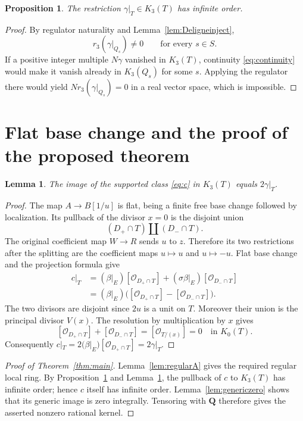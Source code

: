 \documentclass[11pt,a4paper]{article}
\newtheorem{proposition}[theorem]{Proposition}
\newtheorem{lemma}[theorem]{Lemma}
\theoremstyle{remark}
\newcommand{\Q}{\mathbf Q}
\newcommand{\OO}{\mathcal O}
\begin{document}
\begin{proposition}\label{prop:infinite}
The restriction $\gamma|_T\in K_3(T)$ has infinite order.
\end{proposition}
\begin{proof}
By regulator naturality and Lemma~\ref{lem:Deligneinject},
\[
r_3(\gamma|_{Q_s})\neq 0
\qquad\text{for every }s\in S.
\]
If a positive integer multiple $N\gamma$ vanished in $K_3(T)$, continuity \eqref{eq:continuity} would make it vanish already in $K_3(Q_s)$ for some $s$. Applying the regulator there would yield $N r_3(\gamma|_{Q_s})=0$ in a real vector space, which is impossible.
\end{proof}

\section{Flat base change and the proof of the proposed theorem}

\begin{lemma}\label{lem:basechange}
The image of the supported class \eqref{eq:c} in $K_3(T)$ equals $2\gamma|_T$.
\end{lemma}
\begin{proof}
The map $A\to B[1/u]$ is flat, being a finite free base change followed by localization. Its pullback of the divisor $x=0$ is the disjoint union
\[
(D_+\cap T)\amalg(D_-\cap T).
\]
The original coefficient map $W\to R$ sends $u$ to $z$. Therefore its two restrictions after the splitting are the coefficient maps $u\mapsto u$ and $u\mapsto -u$. Flat base change and the projection formula give
\begin{align*}
c|_T
&=(\beta|_E)[\OO_{D_+\cap T}]+(\sigma\beta|_E)[\OO_{D_-\cap T}]\\
&=(\beta|_E)\bigl([\OO_{D_+\cap T}]-[\OO_{D_-\cap T}]\bigr).
\end{align*}
The two divisors are disjoint since $2u$ is a unit on $T$. Moreover their union is the principal divisor $V(x)$. The resolution by multiplication by $x$ gives
\[
[\OO_{D_+\cap T}]+[\OO_{D_-\cap T}]
=[\OO_{T/(x)}]=0\quad\text{in }K_0(T).
\]
Consequently $c|_T=2(\beta|_E)[\OO_{D_+\cap T}]=2\gamma|_T$.
\end{proof}

\begin{proof}[Proof of Theorem~\ref{thm:main}]
Lemma~\ref{lem:regularA} gives the required regular local ring. By Proposition~\ref{prop:infinite} and Lemma~\ref{lem:basechange}, the pullback of $c$ to $K_3(T)$ has infinite order; hence $c$ itself has infinite order. Lemma~\ref{lem:genericzero} shows that its generic image is zero integrally. Tensoring with $\Q$ therefore gives the asserted nonzero rational kernel.
\end{proof}
\end{document}

